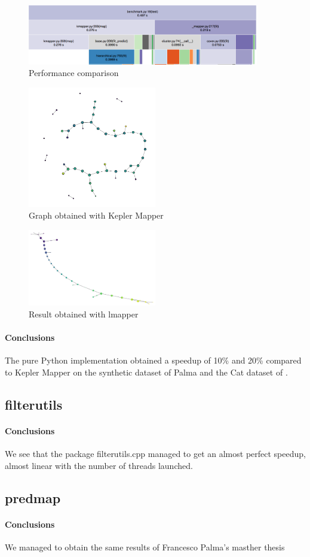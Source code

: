\begin{figure}[h]
	\caption{Performance comparison}
	\centering
	\includegraphics[width=0.9\textwidth]{images/benchmark/cat/benchmark}
\end{figure}
\begin{figure}[h]
	\caption{Graph obtained with Kepler Mapper}
	\centering
	\includegraphics[width=0.5\textwidth]{images/benchmark/cat/benchmark_kmapper}
\end{figure}
\begin{figure}[h]
	\caption{Result obtained with lmapper}
	\centering
	\includegraphics[width=0.5\textwidth]{images/benchmark/cat/benchmark_lmapper}
\end{figure}

\paragraph{Conclusions}
The pure Python implementation obtained a speedup of 10\% and 20\% compared to Kepler Mapper on the synthetic dataset of Palma and the Cat dataset of \cite{pythonmapper}.


\subsection{filterutils}
\paragraph{Conclusions}
We see that the package filterutils.cpp managed to get an almost perfect speedup, almost linear with the number of threads launched.

\subsection{predmap}

\paragraph{Conclusions}
We managed to obtain the same results of Francesco Palma's masther thesis